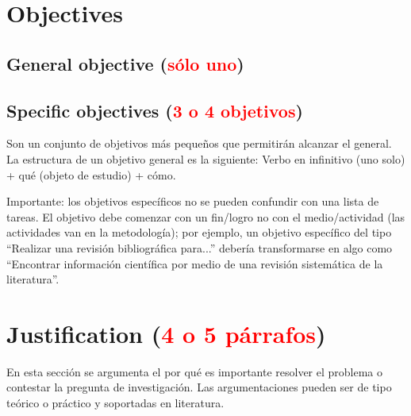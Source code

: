 \documentclass[12pt,letterpaper]{article}
\begin{document}
\section{Objectives}

\subsection{General objective (\textcolor{red}{sólo uno})}

\subsection{Specific objectives (\textcolor{red}{3 o 4 objetivos})}

Son un conjunto de objetivos más pequeños que permitirán alcanzar el general.
La estructura de un objetivo general es la siguiente: Verbo en infinitivo (uno
solo) + qué (objeto de estudio) + cómo.

Importante: los objetivos específicos no se pueden confundir con una lista de
tareas. El objetivo debe comenzar con un fin/logro no con el medio/actividad
(las actividades van en la metodología); por ejemplo, un objetivo específico
del tipo ``Realizar una revisión bibliográfica para...'' debería transformarse
en algo como ``Encontrar información científica por medio de una revisión
sistemática de la literatura''.


\section{Justification (\textcolor{red}{4 o 5 párrafos})}

En esta sección se argumenta el por qué es importante resolver el problema o
contestar la pregunta de investigación. Las argumentaciones pueden ser de tipo
teórico o práctico y soportadas en literatura.
\end{document}
